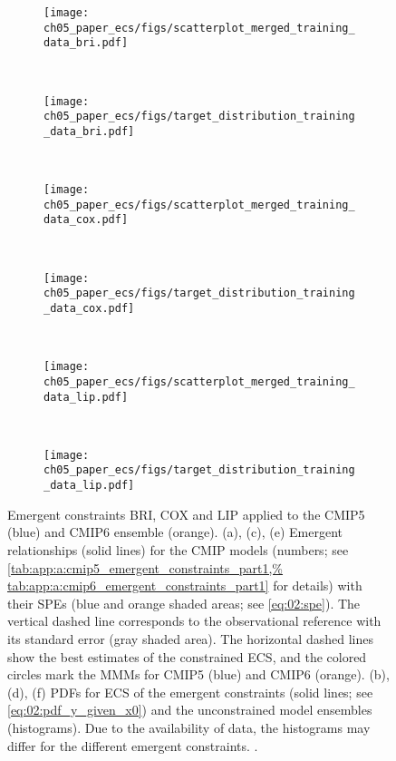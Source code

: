 \begin{figure}[p]
  \centering
  \begin{subfigure}[b]{\SmallSubfigureWidth{}}
    \texttt{[image: 
      ch05\_paper\_ecs/figs/scatterplot\_merged\_training\_data\_bri.pdf]}
    \caption{}
    \label{fig:05:bri_cox_lip:a}
  \end{subfigure}
  ~
  \begin{subfigure}[b]{\SmallSubfigureWidth{}}
    \texttt{[image: 
      ch05\_paper\_ecs/figs/target\_distribution\_training\_data\_bri.pdf]}
    \caption{}
    \label{fig:05:bri_cox_lip:b}
  \end{subfigure}
  \\
  \begin{subfigure}[b]{\SmallSubfigureWidth{}}
    \texttt{[image: 
      ch05\_paper\_ecs/figs/scatterplot\_merged\_training\_data\_cox.pdf]}
    \caption{}
    \label{fig:05:bri_cox_lip:c}
  \end{subfigure}
  ~
  \begin{subfigure}[b]{\SmallSubfigureWidth{}}
    \texttt{[image: 
      ch05\_paper\_ecs/figs/target\_distribution\_training\_data\_cox.pdf]}
    \caption{}
    \label{fig:05:bri_cox_lip:d}
  \end{subfigure}
  \\
  \begin{subfigure}[b]{\SmallSubfigureWidth{}}
    \texttt{[image: 
      ch05\_paper\_ecs/figs/scatterplot\_merged\_training\_data\_lip.pdf]}
    \caption{}
    \label{fig:05:bri_cox_lip:e}
  \end{subfigure}
  ~
  \begin{subfigure}[b]{\SmallSubfigureWidth{}}
    \texttt{[image: 
      ch05\_paper\_ecs/figs/target\_distribution\_training\_data\_lip.pdf]}
    \caption{}
    \label{fig:05:bri_cox_lip:f}
  \end{subfigure}
  \caption[
    Emergent constraints BRI, COX and LIP applied to the \acs{CMIP}5 and
    \acs{CMIP}6 ensemble.
  ]{
    Emergent constraints BRI, COX and LIP applied to the \acs{CMIP}5 (blue) and
    \acs{CMIP}6 ensemble (orange). (a), (c), (e) Emergent relationships (solid
    lines) for the \acs{CMIP} models (numbers; see
    \cref{tab:app:a:cmip5_emergent_constraints_part1,%
      tab:app:a:cmip6_emergent_constraints_part1} for details) with their
    \aclp{SPE} (blue and orange shaded areas; see \cref{eq:02:spe}). The
    vertical dashed line corresponds to the observational reference with its
    standard error (gray shaded area). The horizontal dashed lines show the
    best estimates of the constrained \acf{ECS}, and the colored circles mark
    the \aclp{MMM} for \acs{CMIP}5 (blue) and \acs{CMIP}6 (orange). (b), (d),
    (f) \Aclp{PDF} for \acs{ECS} of the emergent constraints (solid lines;
    see \cref{eq:02:pdf_y_given_x0}) and the unconstrained model ensembles
    (histograms). Due to the availability of data, the histograms may differ
    for the different emergent constraints. .
  }
  \label{fig:05:bri_cox_lip}
\end{figure}


